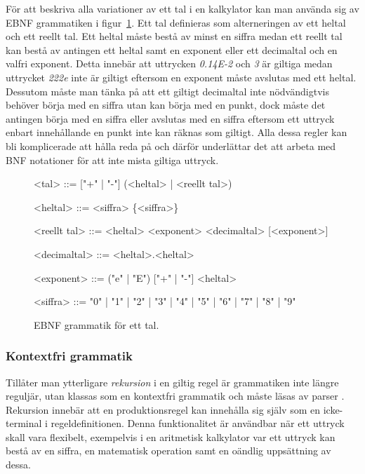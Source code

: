 För att beskriva alla variationer av ett tal i en kalkylator kan man
använda sig av EBNF grammatiken i figur~\ref{fig:reg}. Ett tal definieras som
alterneringen av ett heltal och ett reellt tal. Ett heltal måste bestå av
minst en siffra medan ett reellt tal kan bestå av antingen ett heltal samt en
exponent eller ett decimaltal och en valfri exponent. Detta innebär att
uttrycken \textit{0.14E-2} och \textit{3} är giltiga medan uttrycket
\textit{222e} inte är giltigt eftersom en exponent måste avslutas med ett
heltal. Dessutom måste man tänka på att ett giltigt decimaltal inte
nödvändigtvis behöver börja med en siffra utan kan börja med en punkt, dock
måste det antingen börja med en siffra eller avslutas med en siffra eftersom
ett uttryck enbart innehållande en punkt inte kan räknas som giltigt. Alla
dessa regler kan bli komplicerade att hålla reda på och därför underlättar det
att arbeta med BNF notationer för att inte mista giltiga uttryck.

\begin{figure}[ht]
  \begin{grammar}
    \singlespace\small%
    \selectfont

    <tal> ::= ["+" | "-"] (<heltal> | <reellt tal>)

    <heltal> ::= <siffra> \{<siffra>\}

    <reellt tal> ::= <heltal> <exponent>
      \alt <decimaltal> [<exponent>]

    <decimaltal> ::= <heltal>.<heltal>

    <exponent> ::= ("e" | "E") ["+" | "-"] <heltal>

    <siffra> ::= "0" | "1" | "2" | "3" | "4" | "5" | "6" | "7" | "8" | "9"

  \end{grammar}
  \caption{EBNF grammatik för ett tal.}
  \label{fig:reg}
\end{figure}

\subsubsection{Kontextfri grammatik}

Tillåter man ytterligare \textit{rekursion} i en giltig regel är grammatiken
inte längre reguljär, utan klassas som en kontextfri grammatik och måste
läsas av parser \citep[s. 100]{sm09}. Rekursion innebär att en
produktionsregel kan innehålla sig själv som en icke-terminal i
regeldefinitionen. Denna funktionalitet är användbar när ett uttryck skall
vara flexibelt, exempelvis i en aritmetisk kalkylator var ett uttryck kan
bestå av en siffra, en matematisk operation samt en oändlig uppsättning av
dessa.


